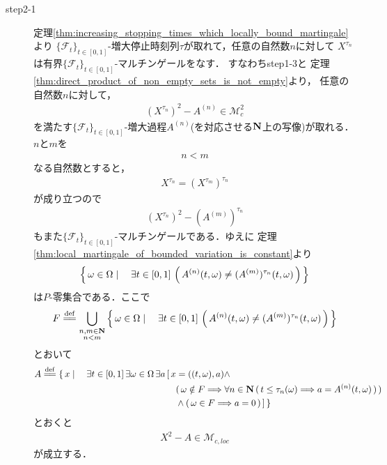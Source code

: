 \begin{sketch}
\begin{description}
			\item[step2-1]
				定理\ref{thm:increasing_stopping_times_which_locally_bound_martingale}より
				$\{\mathscr{F}_{t}\}_{t \in [0,1]}$-増大停止時刻列$\tau$が取れて，任意の自然数$n$に対して
				$X^{\tau_{n}}$は有界$\{\mathscr{F}_{t}\}_{t \in [0,1]}$-マルチンゲールをなす．
				すなわちstep1-3と
				定理\ref{thm:direct_product_of_non_empty_sets_is_not_empty}より，
				任意の自然数$n$に対して，
				\begin{align}
					\left(X^{\tau_{n}}\right)^{2} - A^{(n)} \in \mathscr{M}^{2}_{c}
				\end{align}
				を満たす$\{\mathscr{F}_{t}\}_{t \in [0,1]}$-増大過程$A^{(n)}$(を対応させる$\mathbf{N}$上の写像)が取れる．
				$n$と$m$を
				\begin{align}
					n < m
				\end{align}
				なる自然数とすると，
				\begin{align}
					X^{\tau_{n}} = \left(X^{\tau_{m}}\right)^{\tau_{n}}
				\end{align}
				が成り立つので
				\begin{align}
					\left(X^{\tau_{n}}\right)^{2} - (A^{(m)})^{\tau_{n}}
				\end{align}
				もまた$\{\mathscr{F}_{t}\}_{t \in [0,1]}$-マルチンゲールである．ゆえに
				定理\ref{thm:local_martingale_of_bounded_variation_is_constant}より
				\begin{align}
					\left\{\, \omega \in \Omega \mid \quad \exists t \in [0,1]\, \left(\, A^{(n)}(t,\omega) \neq (A^{(m)})^{\tau_{n}}(t,\omega)\, \right)\, \right\}
				\end{align}
				は$P$-零集合である．ここで
				\begin{align}
					F \defeq \bigcup_{\substack{n,m \in \Natural \\ n < m}} \Set{\omega \in \Omega}{\exists t \in [0,1]\, \left(\, A^{(n)}(t,\omega) \neq (A^{(m)})^{\tau_{n}}(t,\omega)\, \right)}
				\end{align}
				とおいて
				\begin{align}
					A \defeq \{\, x \mid \quad 
					\exists t \in [0,1]\, \exists \omega \in \Omega\, \exists a\,
					&[\, x = ((t,\omega),a) \wedge \\
					&\quad (\, \omega \notin F \Longrightarrow \forall n \in \Natural\, 
					(\, t \leq \tau_{n}(\omega) \Longrightarrow a = A^{(n)}(t,\omega)\, )\, )\, \\
					&\quad \wedge (\, \omega \in F \Longrightarrow a = 0\, )\, ]\, \}
				\end{align}
				とおくと
				\begin{align}
					X^{2} - A \in \mathscr{M}_{c,loc}
				\end{align}
				が成立する．
				

\end{description}
\end{sketch}
